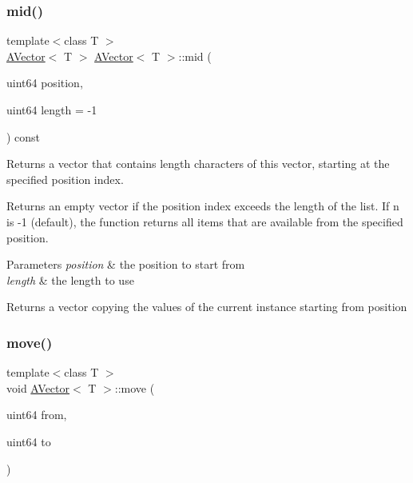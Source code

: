 \subsubsection{\texorpdfstring{mid()}{mid()}}
{\footnotesize\ttfamily template$<$class T $>$ \\
\mbox{\hyperlink{class_a_vector}{A\+Vector}}$<$ T $>$ \mbox{\hyperlink{class_a_vector}{A\+Vector}}$<$ T $>$\+::mid (\begin{DoxyParamCaption}\item[{uint64}]{position,  }\item[{uint64}]{length = {\ttfamily -\/1} }\end{DoxyParamCaption}) const}



Returns a vector that contains length characters of this vector, starting at the specified position index. 

Returns an empty vector if the position index exceeds the length of the list. If n is -\/1 (default), the function returns all items that are available from the specified position.


\begin{DoxyParams}{Parameters}
{\em position} & the position to start from \\
\hline
{\em length} & the length to use \\
\hline
\end{DoxyParams}
\begin{DoxyReturn}{Returns}
a vector copying the values of the current instance starting from position 
\end{DoxyReturn}
\mbox{\label{class_a_vector_af045120312bc7a66ab31684bdbb039bd}} 
\subsubsection{\texorpdfstring{move()}{move()}}
{\footnotesize\ttfamily template$<$class T $>$ \\
void \mbox{\hyperlink{class_a_vector}{A\+Vector}}$<$ T $>$\+::move (\begin{DoxyParamCaption}\item[{uint64}]{from,  }\item[{uint64}]{to }\end{DoxyParamCaption})}



